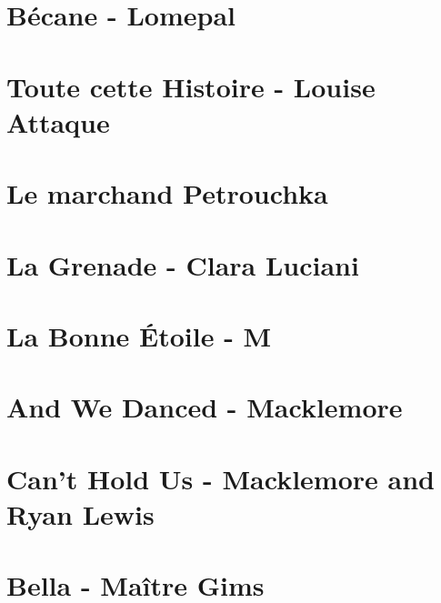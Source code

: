 \documentclass[11pt]{article}
\begin{document}
\section{Bécane - Lomepal}


\section{Toute cette Histoire - Louise Attaque}


\section{Le marchand Petrouchka}
\begin{guitar}

\end{guitar}

\section{La Grenade - Clara Luciani}
\begin{guitar}

\end{guitar}

\section{La Bonne Étoile - M}
\begin{guitar}

\end{guitar}

\section{And We Danced - Macklemore}
\begin{guitar}

\end{guitar}

\section{Can't Hold Us - Macklemore and Ryan Lewis}
\begin{guitar}

\end{guitar}

\section{Bella - Maître Gims}
\begin{guitar}

\end{guitar}
\end{document}
